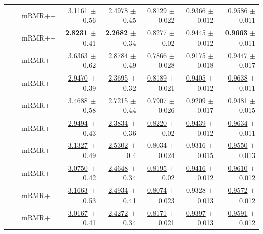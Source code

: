 \begin{longtable}{llp{}rrrrr}
 &  & mRMR++ & \underline{3.1161} {\scriptsize $\pm$ 0.56} & \underline{2.4978} {\scriptsize $\pm$ 0.45} & \underline{0.8129} {\scriptsize $\pm$ 0.022} & \underline{0.9366} {\scriptsize $\pm$ 0.012} & \underline{0.9586} {\scriptsize $\pm$ 0.011} \\
 &  & mRMR++ & \textbf{2.8231} {\scriptsize $\pm$ 0.41} & \textbf{2.2682} {\scriptsize $\pm$ 0.34} & \underline{0.8277} {\scriptsize $\pm$ 0.02} & \underline{0.9445} {\scriptsize $\pm$ 0.012} & \textbf{0.9663} {\scriptsize $\pm$ 0.011} \\
 &  & mRMR++ & 3.6363 {\scriptsize $\pm$ 0.62} & 2.8784 {\scriptsize $\pm$ 0.49} & 0.7866 {\scriptsize $\pm$ 0.028} & 0.9175 {\scriptsize $\pm$ 0.018} & 0.9447 {\scriptsize $\pm$ 0.017} \\
 &  & mRMR+ & \underline{2.9470} {\scriptsize $\pm$ 0.39} & \underline{2.3695} {\scriptsize $\pm$ 0.32} & \underline{0.8189} {\scriptsize $\pm$ 0.021} & \underline{0.9405} {\scriptsize $\pm$ 0.012} & \underline{0.9638} {\scriptsize $\pm$ 0.011} \\
 &  & mRMR+ & 3.4688 {\scriptsize $\pm$ 0.58} & 2.7215 {\scriptsize $\pm$ 0.44} & 0.7907 {\scriptsize $\pm$ 0.026} & 0.9209 {\scriptsize $\pm$ 0.017} & 0.9481 {\scriptsize $\pm$ 0.015} \\
 &  & mRMR+ & \underline{2.9494} {\scriptsize $\pm$ 0.43} & \underline{2.3834} {\scriptsize $\pm$ 0.36} & \underline{0.8220} {\scriptsize $\pm$ 0.02} & \underline{0.9439} {\scriptsize $\pm$ 0.012} & \underline{0.9634} {\scriptsize $\pm$ 0.011} \\
 &  & mRMR+ & \underline{3.1327} {\scriptsize $\pm$ 0.49} & \underline{2.5302} {\scriptsize $\pm$ 0.4} & 0.8034 {\scriptsize $\pm$ 0.024} & 0.9316 {\scriptsize $\pm$ 0.015} & \underline{0.9550} {\scriptsize $\pm$ 0.013} \\
 &  & mRMR+ & \underline{3.0750} {\scriptsize $\pm$ 0.42} & \underline{2.4648} {\scriptsize $\pm$ 0.34} & \underline{0.8195} {\scriptsize $\pm$ 0.02} & \underline{0.9416} {\scriptsize $\pm$ 0.012} & \underline{0.9610} {\scriptsize $\pm$ 0.012} \\
 &  & mRMR+ & \underline{3.1663} {\scriptsize $\pm$ 0.53} & \underline{2.4934} {\scriptsize $\pm$ 0.41} & \underline{0.8074} {\scriptsize $\pm$ 0.023} & 0.9328 {\scriptsize $\pm$ 0.013} & \underline{0.9572} {\scriptsize $\pm$ 0.012} \\
 &  & mRMR+ & \underline{3.0167} {\scriptsize $\pm$ 0.41} & \underline{2.4272} {\scriptsize $\pm$ 0.34} & \underline{0.8171} {\scriptsize $\pm$ 0.021} & \underline{0.9397} {\scriptsize $\pm$ 0.013} & \underline{0.9591} {\scriptsize $\pm$ 0.012} \\

\end{longtable}

